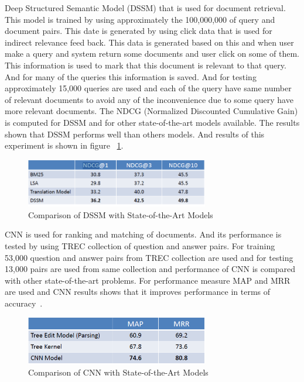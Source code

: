 \documentclass{doublecol-new}
\theoremstyle{TH}{
\newtheorem{lemma}{Lemma}
\newtheorem{theorem}[lemma]{Theorem}
\newtheorem{corrolary}[lemma]{Corrolary}
\newtheorem{conjecture}[lemma]{Conjecture}
\newtheorem{proposition}[lemma]{Proposition}
\newtheorem{claim}[lemma]{Claim}
\newtheorem{stheorem}[lemma]{Wrong Theorem}
\newtheorem{algorithm}{Algorithm}
}
\theoremstyle{THrm}{
\newtheorem{definition}{Definition}[section]
\newtheorem{question}{Question}[section]
\newtheorem{remark}{Remark}
\newtheorem{scheme}{Scheme}
}
\theoremstyle{THhit}{
\newtheorem{case}{Case}[section]
}
\begin{document}
Deep Structured Semantic Model (DSSM) that is used for document retrieval. This model is trained by using approximately the 100,000,000 of query and document pairs. This date is generated by using click data that is used for indirect relevance feed back. This data is generated based on this and when user make a query and system return some documents and user click on some of them. This information is used to mark that this document is relevant to that query. And for many of the queries this information is saved. And for testing approximately 15,000 queries are used and each of the query have same number of relevant documents to avoid any of the inconvenience due to some query have more relevant documents. The NDCG (Normalized Discounted Cumulative Gain)  is computed for DSSM and for other state-of-the-art models available. The results shown that DSSM performs well than others models. And results of this experiment is shown in figure ~\ref{fig:DSSM-result}.
\begin{figure}[h]
	\centerline{\includegraphics[width=8cm,keepaspectratio]{image/DSSM-result.PNG}}
	\caption{Comparison of DSSM with State-of-the-Art Models}
	\label{fig:DSSM-result}
\end{figure}

CNN is used for ranking and matching of documents. And its performance is tested by using TREC collection of question and answer pairs. For training 53,000 question and answer pairs from TREC collection are used and for testing 13,000 pairs are used from same collection and performance of CNN is compared with other state-of-the-art problems. For performance measure MAP and MRR are used and CNN results shows that it improves performance in terms of accuracy~\cite{severyn2015learning}. 

\begin{figure}[h]
	\centerline{\includegraphics[width=8cm,keepaspectratio]{image/CNN-result.PNG}}
	\caption{Comparison of CNN with State-of-the-Art Models}
	\label{fig:CNN-result}
\end{figure}
\end{document}

